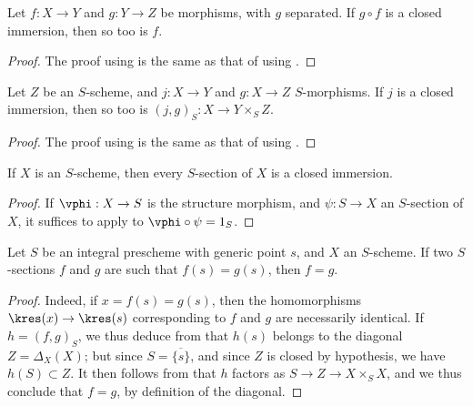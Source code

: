\begin{corollary}[5.4.4]
\label{I.5.4.4}
Let $f:X\to Y$ and $g:Y\to Z$ be morphisms, with $g$ separated.
If $g\circ f$ is a closed immersion, then so too is $f$.
\end{corollary}

\begin{proof}
The proof using  is the same as that of  using .
\end{proof}

\begin{corollary}[5.4.5]
\label{I.5.4.5}
Let $Z$ be an $S$-scheme, and $j:X\to Y$ and $g:X\to Z$ $S$-morphisms.
If $j$ is a closed immersion, then so too is $(j,g)_S:X\to Y\times_S Z$.
\end{corollary}

\begin{proof}
The proof using  is the same as that of  using .
\end{proof}

\begin{corollary}[5.4.6]
\label{I.5.4.6}
If $X$ is an $S$-scheme, then every $S$-section of $X$  is a closed immersion.
\end{corollary}

\begin{proof}
If $\vphi:X\to S$ is the structure morphism, and $\psi:S\to X$ an $S$-section of $X$, it suffices to apply  to $\vphi\circ\psi=1_S$.
\end{proof}

\begin{corollary}[5.4.7]
\label{I.5.4.7}
Let $S$ be an integral prescheme with generic point $s$, and $X$ an $S$-scheme.
If two $S$-sections $f$ and $g$ are such that $f(s)=g(s)$, then $f=g$.
\end{corollary}

\begin{proof}
Indeed, if $x=f(s)=g(s)$, then the homomorphisms $\kres(x)\to\kres(s)$ corresponding to $f$ and $g$ are necessarily identical.
If $h=(f,g)_S$, we thus deduce from  that $h(s)$ belongs to the diagonal $Z=\Delta_X(X)$;
but since $S=\overline{\{s\}}$, and since $Z$ is closed by hypothesis, we have $h(S)\subset Z$.
It then follows from  that $h$ factors as $S\to Z\to X\times_S X$, and we thus conclude that $f=g$, by definition of the diagonal.
\end{proof}

